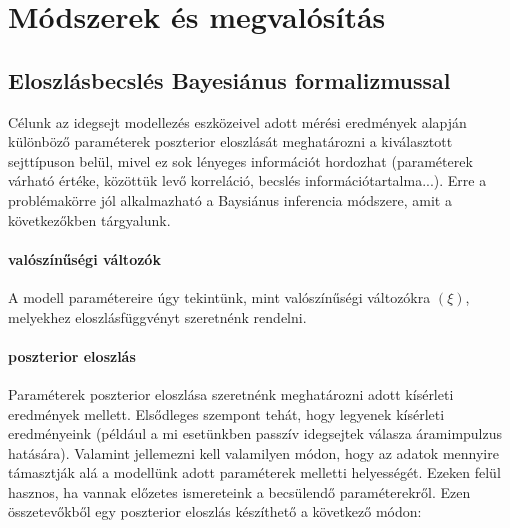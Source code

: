 \section{Módszerek és megvalósítás}

\subsection{Eloszlásbecslés Bayesiánus formalizmussal}
Célunk az idegsejt modellezés eszközeivel adott mérési eredmények alapján különböző paraméterek poszterior eloszlását meghatározni a kiválasztott sejttípuson belül, mivel ez sok lényeges információt hordozhat (paraméterek várható értéke, közöttük levő korreláció, becslés információtartalma...). Erre a problémakörre jól alkalmazható a Baysiánus inferencia módszere, amit a következőkben tárgyalunk.

\paragraph{valószínűségi változók}
A modell paramétereire úgy tekintünk, mint valószínűségi változókra $(\xi)$, melyekhez eloszlásfüggvényt szeretnénk rendelni.

\paragraph{poszterior eloszlás}
Paraméterek poszterior eloszlása szeretnénk meghatározni adott kísérleti eredmények mellett.
Elsődleges szempont tehát, hogy legyenek kísérleti eredményeink (például a mi esetünkben passzív idegsejtek válasza áramimpulzus hatására). Valamint jellemezni kell valamilyen módon, hogy az adatok mennyire támasztják alá a modellünk adott paraméterek melletti helyességét. Ezeken felül hasznos, ha vannak előzetes ismereteink a becsülendő paraméterekről. Ezen összetevőkből egy poszterior eloszlás készíthető a következő módon:

